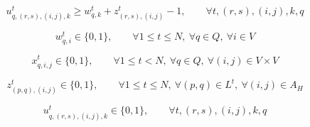 \documentclass[UTF8,11pt]{ctexart}
\begin{document}
\begin{equation}
u_{q,(r,s),(i,j),k}^t \ge w_{q,k}^t + z_{(r,s),(i,j)}^t - 1,
\qquad
\forall t,(r,s),(i,j),k,q
\tag{2e}
\end{equation}

\begin{equation}
w_{q,i}^t \in \{0,1\},
\qquad
\forall 1 \le t \le N,\ \forall q \in Q,\ \forall i \in V
\tag{3a}
\end{equation}

\begin{equation}
x_{q,i,j}^t \in \{0,1\},
\qquad
\forall 1 \le t < N,\ \forall q \in Q,\ \forall (i,j) \in V \times V
\tag{3b}
\end{equation}

\begin{equation}
z_{(p,q),(i,j)}^t \in \{0,1\},
\qquad
\forall 1 \le t \le N,\ \forall (p,q) \in L^t,\ \forall (i,j) \in A_H
\tag{3c}
\end{equation}

\begin{equation}
u_{q,(r,s),(i,j),k}^t \in \{0,1\},
\qquad
\forall t,(r,s),(i,j),k,q
\tag{3d}
\end{equation}
\end{document}
